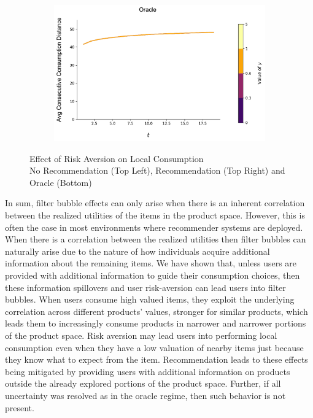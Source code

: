 \documentclass[format=acmsmall, review=false]{acmart}
\begin{document}
\begin{figure}[t]
\begin{subfigure}{.45\textwidth}
\includegraphics[width=\linewidth]{figures/gamma_consumption_dist_N_200T_20_omni.pdf}\\
\end{subfigure}%
\caption{Effect of Risk Aversion on Local Consumption \\ No Recommendation (Top Left), Recommendation (Top Right) and Oracle (Bottom)}
\label{fig:no_rec_risk_aversion}
\end{figure}

In sum, filter bubble effects can only arise when there is an inherent correlation between the realized utilities of the items in the product space. However, this is often the case in most environments where recommender systems are deployed. When there is a correlation between the realized utilities then filter bubbles can naturally arise due to the nature of how individuals acquire additional information about the remaining items. We have shown that, unless users are provided with additional information to guide their consumption choices, then these information spillovers and user risk-aversion can lead users into filter bubbles. When users consume high valued items, they exploit the underlying correlation across different products' values, stronger for similar products, which leads them to increasingly consume products in narrower and narrower portions of the product space. Risk aversion may lead users into performing local consumption even when they have a low valuation of nearby items just because they know what to expect from the item. Recommendation leads to these effects being mitigated by providing users with additional information on products outside the already explored portions of the product space. Further, if all uncertainty was resolved as in the oracle regime, then such behavior is not present.
\end{document}
